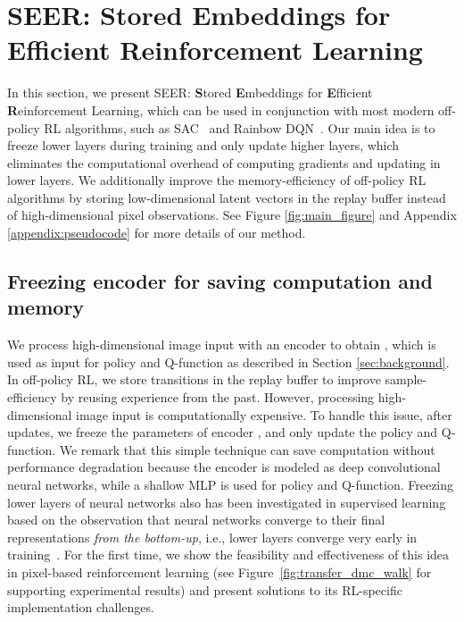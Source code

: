 \documentclass{article}
\begin{document}
\section{SEER: Stored Embeddings for Efficient Reinforcement Learning}

In this section, we present SEER: {\bf S}tored {\bf E}mbeddings for {\bf E}fficient {\bf R}einforcement Learning, which can be used in conjunction with most modern off-policy RL algorithms, such as SAC~\citep{haarnoja2018soft} and Rainbow DQN~\citep{hessel2018rainbow}.
Our main idea is to freeze lower layers during training and only update higher layers, which eliminates the computational overhead of computing gradients and updating in lower layers.
We additionally improve the memory-efficiency of off-policy RL algorithms by storing low-dimensional latent vectors in the replay buffer instead of high-dimensional pixel observations. See Figure \ref{fig:main_figure} and 
Appendix \ref{appendix:pseudocode} for more details of our method.

\subsection{Freezing encoder for saving computation and memory} \label{sec:freezing_encoder}

We process high-dimensional image input with an encoder  to obtain , which is used as input for policy  and Q-function  as described in Section \ref{sec:background}. In off-policy RL, 
we store transitions  in the replay buffer  to improve sample-efficiency by reusing experience from the past.
However, processing high-dimensional image input  is computationally expensive. 
To handle this issue, after  updates,
we freeze the parameters of encoder , and only update the policy and Q-function.
We remark that this simple technique can save computation without performance degradation because the encoder is modeled as deep convolutional neural networks, while a shallow MLP is used for policy and Q-function. Freezing lower layers of neural networks also has been investigated in supervised learning based on the observation that neural networks converge to their final representations {\em from the bottom-up}, i.e., lower layers converge very early in training~\citep{46337}. For the first time, we show the feasibility and effectiveness of this idea in pixel-based reinforcement learning (see Figure~\ref{fig:transfer_dmc_walk} for supporting experimental results) and present solutions to its RL-specific implementation challenges. 
\end{document}
